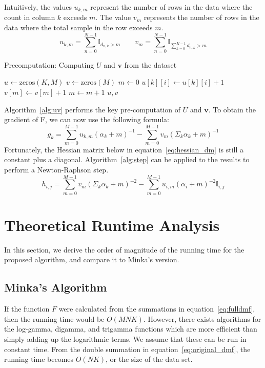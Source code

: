 \documentclass[twoside]{article}
\begin{document}
Intuitively, the values $u_{k,m}$ represent the number of rows in the data where the count in column $k$ exceeds $m$.  The value $v_m$ represents the number of rows in the data where the total sample in the row exceeds $m$.  
\[
u_{k,m}=\sum_{n=0}^{N-1}\mathbb{I}_{d_{n,k} > m} \qquad v_m=\sum_{n=0}^{N-1}\mathbb{I}_{\sum_{k=0}^{K-1}d_{n,k} > m}
\]
\begin{algorithm}
  \caption{Precomputation: Computing $U$ and $\mathbf{v}$ from the dataset}
  \begin{algorithmic}
    \State $u \gets \text{zeros}(K, M)$
    \State $v \gets \text{zeros}(M)$
      \State $m \leftarrow 0$
          \State $u[k][i] \leftarrow u[k][i] + 1$
          \State $v[m] \leftarrow v[m] + 1$        
          \State $m \leftarrow m + 1$
        \EndFor
      \EndFor
    \EndFor
    \State \Return $u, v$
  \EndFunction
  \end{algorithmic}
  \label{alg:uv}
\end{algorithm}

Algorithm~\ref{alg:uv} performs the key pre-computation of $U$ and $\mathbf{v}$. To obtain the gradient of F, we can now use the following formula:
\begin{equation}
g_k= \sum_{m=0}^{M-1}u_{k,m}(\alpha_k+m)^{-1}-
\sum_{m=0}^{M-1}v_m(\Sigma_k\alpha_k+m)^{-1}
\end{equation}
Fortunately, the Hessian matrix below in equation~\ref{eq:hessian_dm} is still a constant plus a diagonal.  Algorithm~\ref{alg:step} can be applied to the results to perform a Newton-Raphson step.
\begin{equation} \label{eq:hessian_dm}
h_{i,j}=\sum_{m=0}^{M-1}v_m(\Sigma_k\alpha_k+m)^{-2}-
\sum_{m=0}^{M-1}u_{i,m}(\alpha_i+m)^{-2}\mathbb{I}_{i,j}
\end{equation}
\section{Theoretical Runtime Analysis}
In this section, we derive the order of magnitude of the running time for the proposed algorithm, and compare it to Minka's version.
\subsection{Minka's Algorithm}
If the function $F$ were calculated from the summations in equation~\eqref{eq:fulldmf}, then the running time would be $O(MNK)$.  However, there exists algorithms for the log-gamma, digamma, and trigamma functions which are more efficient than simply adding up the logarithmic terms\cite{wallach}. We assume that these can be run in constant time.  From the double summation in equation~\eqref{eq:original_dmf}, the running time becomes $O(NK)$, or the size of the data set.
\end{document}
